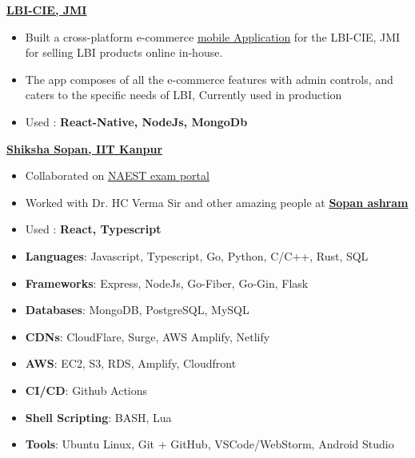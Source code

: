 \documentclass[10pt,a4paper,ragged2e,withhyper]{altacv}
\begin{document}
\begin{paracol}{2}
\divider

\large \textcolor{VividPurple}{\href{https://www.jmi.ac.in/upload/menuupload/cie_division_and_activities.pdf}{\textbf{LBI-CIE, JMI}}}
\begin{itemize}
  \item Built a cross-platform e-commerce \href{https://play.google.com/store/apps/details?id=com.ciejmi}{\underline{mobile Application}} for the LBI-CIE, JMI for selling LBI products online in-house.
  \item The app composes of all the e-commerce features with admin controls, and caters to the specific needs of LBI, Currently used in production
  \item Used : \textcolor{VividPurple}{\textbf{React-Native, NodeJs, MongoDb}} 
\end{itemize}

\divider

\large \textcolor{VividPurple}{\href{https://shiksha-sopan.org}{\textbf{Shiksha Sopan, IIT Kanpur}}}
\begin{itemize}
  \item Collaborated on \href{https://naest.shiksha-sopan.org/}{\underline{NAEST exam portal}}
  \item Worked with Dr. HC Verma Sir and other amazing people at \href{https://www.iitk.ac.in/dora/shiksha-sopan}{\textbf{Sopan ashram}}
  \item Used : \textcolor{VividPurple}{\textbf{React, Typescript }} 
\end{itemize}

\begin{itemize}
    \item \textbf{Languages}:  Javascript, Typescript, Go, Python, C/C++, Rust, SQL
    \item \textbf{Frameworks}:  Express, NodeJs, Go-Fiber, Go-Gin, Flask
    \item \textbf{Databases}:  MongoDB, PostgreSQL, MySQL
    \item \textbf{CDNs}:  CloudFlare, Surge, AWS Amplify, Netlify
    \item \textbf{AWS}:  EC2, S3, RDS, Amplify, Cloudfront
    \item \textbf{CI/CD}:  Github Actions
    \item \textbf{Shell Scripting}:  BASH, Lua
    \item \textbf{Tools}:  Ubuntu Linux, Git + GitHub, VSCode/WebStorm, Android Studio
\end{itemize}


\end{paracol}
\end{document}
